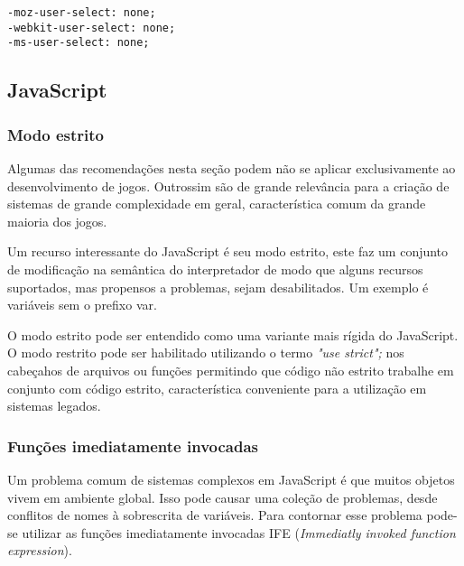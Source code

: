 \begin{draft}
\begin{verbatim}
-moz-user-select: none;
-webkit-user-select: none;
-ms-user-select: none;
\end{verbatim}

\subsection{JavaScript}
\subsubsection{Modo estrito}
Algumas das recomendações nesta seção podem não se aplicar
exclusivamente ao desenvolvimento de jogos. Outrossim são de grande
relevância para a criação de sistemas de grande complexidade em geral,
característica comum da grande maioria dos jogos.

Um recurso interessante do JavaScript é seu modo estrito, este faz
um conjunto de modificação na semântica do interpretador de modo
que alguns recursos suportados, mas propensos a problemas, sejam
desabilitados. Um exemplo é variáveis sem o prefixo var.

O modo estrito pode ser entendido como uma variante mais rígida
do JavaScript. O modo restrito pode ser habilitado utilizando o
termo \textit{"use strict";} nos cabeçahos de arquivos ou funções
permitindo que código não estrito trabalhe em conjunto com código
estrito, característica conveniente para a utilização em sistemas
legados.

\subsubsection{Funções imediatamente invocadas}

Um problema comum de sistemas complexos em JavaScript é que muitos
objetos vivem em ambiente global. Isso pode causar uma coleção de
problemas, desde conflitos de nomes à sobrescrita de variáveis. Para
contornar esse problema pode-se utilizar as funções imediatamente
invocadas IFE (\textit{Immediatly invoked function expression}).
\end{draft}

